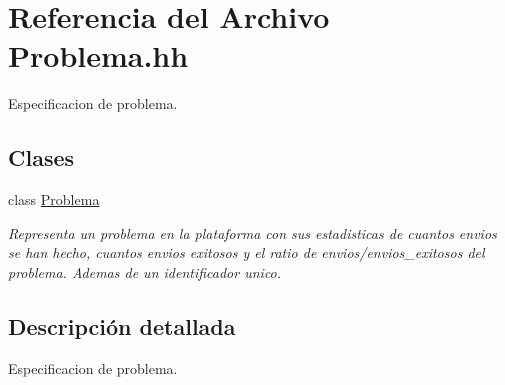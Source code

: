 \hypertarget{_problema_8hh}{}\section{Referencia del Archivo Problema.\+hh}
\label{_problema_8hh}


Especificacion de problema.  


\subsection*{Clases}
\begin{DoxyCompactItemize}
\item 
class \mbox{\hyperlink{class_problema}{Problema}}
\begin{DoxyCompactList}\small\item\em Representa un problema en la plataforma con sus estadisticas de cuantos envios se han hecho, cuantos envios exitosos y el ratio de envios/envios\+\_\+exitosos del problema. Ademas de un identificador unico. \end{DoxyCompactList}\end{DoxyCompactItemize}


\subsection{Descripción detallada}
Especificacion de problema. 

